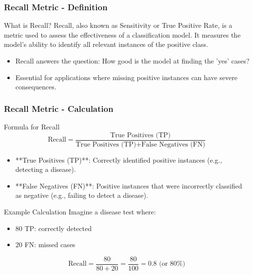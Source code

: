 \documentclass[aspectratio=169]{beamer}
\begin{document}
\begin{frame}[fragile]
    \frametitle{Recall Metric - Definition}
    \begin{block}{What is Recall?}
        Recall, also known as Sensitivity or True Positive Rate, is a metric used to assess the effectiveness of a classification model. It measures the model's ability to identify all relevant instances of the positive class.
    \end{block}
    \begin{itemize}
        \item Recall answers the question: How good is the model at finding the 'yes' cases?
        \item Essential for applications where missing positive instances can have severe consequences.
    \end{itemize}
\end{frame}

\begin{frame}[fragile]
    \frametitle{Recall Metric - Calculation}
    \begin{block}{Formula for Recall}
        \begin{equation}
            \text{Recall} = \frac{\text{True Positives (TP)}}{\text{True Positives (TP)} + \text{False Negatives (FN)}}
        \end{equation}
    \end{block}
    \begin{itemize}
        \item **True Positives (TP)**: Correctly identified positive instances (e.g., detecting a disease).
        \item **False Negatives (FN)**: Positive instances that were incorrectly classified as negative (e.g., failing to detect a disease).
    \end{itemize}
    \begin{block}{Example Calculation}
        Imagine a disease test where:
        \begin{itemize}
            \item 80 TP: correctly detected
            \item 20 FN: missed cases
        \end{itemize}
        \begin{equation}
            \text{Recall} = \frac{80}{80 + 20} = \frac{80}{100} = 0.8 \text{ (or 80\%)}
        \end{equation}
    \end{block}
\end{frame}
\end{document}
